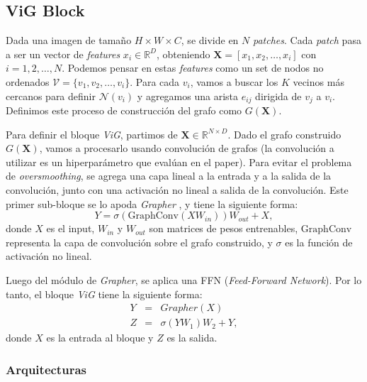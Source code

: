 \documentclass{article}
\begin{document}
\subsection{ViG Block}

Dada una imagen de tamaño $H \times W \times C$, se divide en $N$ \textit{patches}. Cada \textit{patch} pasa a
ser un vector de \textit{features} $x_i \in \mathbb{R}^{D}$, obteniendo $\boldsymbol{X} = [x_1, x_2, \dots, x_i]$ con $i = 1, 2, \dots, N$. Podemos pensar en estas \textit{features} como un set de nodos no ordenados $\mathcal{V} = \{v_1, v_2, \dots, v_i\}$. Para cada $v_i$, vamos a buscar
los $K$ vecinos más cercanos para definir $\mathcal{N}(v_i)$ y agregamos una arista $e_{ij}$ dirigida de $v_j$ a $v_i$. Definimos este proceso de construcción del grafo como $G(\boldsymbol{X})$.

Para definir el bloque \emph{ViG}, partimos de $\boldsymbol{X} \in \mathbb{R}^{N \times D}$.
Dado el grafo construido $G(\boldsymbol{X})$, vamos a procesarlo usando convolución de grafos (la convolución a utilizar es un hiperparámetro que evalúan en el paper). Para evitar el problema de \textit{oversmoothing}, se agrega una capa lineal a la entrada y a la salida de la convolución, junto con una activación no lineal a salida de la convolución. Este primer sub-bloque se lo apoda \emph{ Grapher }, y tiene la siguiente forma:
\begin{equation}
    Y = \sigma(\mathrm{GraphConv}(X W_{in})) W_{out} + X,
\end{equation}
donde $X$ es el input, $W_{in}$ y $W_{out}$ son matrices de pesos entrenables, $\mathrm{GraphConv}$ representa la capa de convolución sobre el grafo construido, y $\sigma$ es la función de activación no lineal.

Luego del módulo de \emph{Grapher}, se aplica una FFN (\textit{Feed-Forward Network}). Por lo tanto, el bloque \emph{ViG} tiene la siguiente forma:
\begin{equation}
    \begin{array}{ccl}
        Y & = & Grapher(X)            \\
        Z & = & \sigma(Y W_1)W_2 + Y,
    \end{array}
\end{equation}
donde $X$ es la entrada al bloque y $Z$ es la salida.

\subsubsection{Arquitecturas}
\end{document}
